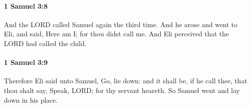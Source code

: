		\paragraph{1 Samuel 3:8} %
			\label{1SAMUEL-3-8}

			And the LORD called Samuel again the third time. And he arose and went to Eli, and said, Here am I; for thou didst call me. And Eli perceived that the LORD had called the child.


		\paragraph{1 Samuel 3:9} %
			\label{1SAMUEL-3-9}

			Therefore Eli said unto Samuel, Go, lie down: and it shall be, if he call thee, that thou shalt say, Speak, LORD; for thy servant heareth. So Samuel went and lay down in his place.



